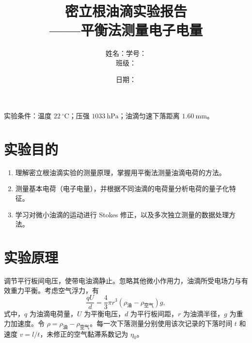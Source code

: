 \documentclass[UTF8,a4paper,12pt]{ctexart}
\title{\bfseries 密立根油滴实验报告\\[0.5em]
\large——平衡法测量电子电量}
\author{姓名：\underline{\hspace{3cm}}\qquad 学号：\underline{\hspace{3cm}}\\[0.5em]
班级：\underline{\hspace{3cm}}}
\date{日期：\underline{\hspace{4cm}}}
\begin{document}
\maketitle

\begin{center}
实验条件：温度 $22\ ^\circ\mathrm{C}$；压强 $1033\ \mathrm{hPa}$；油滴匀速下落距离 $1.60\ \mathrm{mm}$。
\end{center}

\section{实验目的}
\begin{enumerate}
  \item 理解密立根油滴实验的测量原理，掌握用平衡法测量油滴电荷的方法。
  \item 测量基本电荷（电子电量），并根据不同油滴的电荷量分析电荷的量子化特征。
  \item 学习对微小油滴的运动进行 Stokes 修正，以及多次独立测量的数据处理方法。
\end{enumerate}

\section{实验原理}
调节平行板间电压，使带电油滴静止。忽略其他微小作用力，油滴所受电场力与有效重力平衡。考虑空气浮力，有
\begin{equation}
  \frac{qU}{d}=\frac{4}{3}\pi r^3(\rho_{\text{油}}-\rho_{\text{空气}})g,
\end{equation}
式中，$q$ 为油滴电荷量，$U$ 为平衡电压，$d$ 为平行板间距，$r$ 为油滴半径，$g$ 为重力加速度。令 $\rho=\rho_{\text{油}}-\rho_{\text{空气}}$。每一次下落测量分别使用该次记录的下落时间 $t$ 和速度 $v=l/t$，未修正的空气黏滞系数记为 $\eta_0$。
\end{document}

